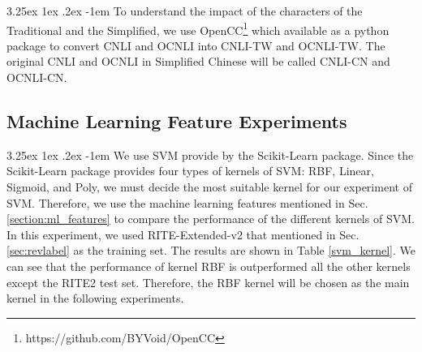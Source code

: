 \documentclass[12pt]{article}
\makeatletter
\renewcommand\paragraph{\@startsection{paragraph}{5}{\z@}%
  {3.25ex \@plus1ex \@minus.2ex}%
  {-1em}%
  {\normalfont\normalsize\bfseries}}
\makeatother
\begin{document}
\begin{CJK*}{UTF8}{bkai}
\begin{spacing}{1.77}
\paragraph{}
To understand the impact of the characters of the Traditional and the Simplified, we use OpenCC\footnote{https://github.com/BYVoid/OpenCC} which available as a python package to convert CNLI and OCNLI into CNLI-TW and OCNLI-TW. The original CNLI and OCNLI in Simplified Chinese will be called CNLI-CN and OCNLI-CN.

\subsection{Machine Learning Feature Experiments}

\paragraph{}
We use SVM provide by the Scikit-Learn package. Since the Scikit-Learn package provides four types of kernels of SVM: RBF, Linear, Sigmoid, and Poly, we must decide the most suitable kernel for our experiment of SVM. Therefore, we use the machine learning features mentioned in Sec. \ref{section:ml_features} to compare the performance of the different kernels of SVM. In this experiment, we used RITE-Extended-v2 that mentioned in Sec. \ref{sec:revlabel} as the training set. The results are shown in Table \ref{svm_kernel}. We can see that the performance of kernel RBF is outperformed all the other kernels except the RITE2 test set. Therefore, the RBF kernel will be chosen as the main kernel in the following experiments.


\end{spacing}
\end{CJK*}
\end{document}
